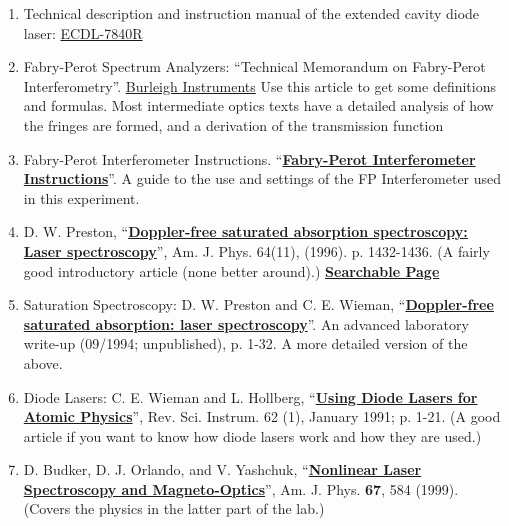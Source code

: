 \documentclass{../lab}
\begin{document}
\begin{enumerate}
    \item Technical description and instruction manual of the extended cavity diode laser: \href{http://physics111.lib.berkeley.edu/Physics111/Equipment_Manuals/manual_D1_ECDL_laser.pdf}{ECDL-7840R}

    \item Fabry-Perot Spectrum Analyzers: ``Technical Memorandum on Fabry-Perot Interferometry''. \href{http://experimentationlab.berkeley.edu/sites/default/files/tech-memo-fp-interferometry.pdf}{Burleigh Instruments} Use this article to get some definitions and formulas. Most intermediate optics texts have a detailed analysis of how the fringes are formed, and a derivation of the transmission function

    \item Fabry-Perot Interferometer Instructions. ``\href{http://physics111.lib.berkeley.edu/Physics111/Reprints/MNO/Fabry-Perot\_Instructions\_OCR.pdf}{\textbf{Fabry-Perot Interferometer Instructions}}''. A guide to the use and settings of the FP Interferometer used in this experiment.

    \item D. W. Preston, ``\href{http://ajp.aapt.org/resource/1/ajpias/v64/i11/p1432\_s1}{\textbf{Doppler-free saturated absorption spectroscopy: Laser spectroscopy}}'', Am. J. Phys. 64(11), (1996). p. 1432-1436. (A fairly good introductory article (none better around).) \href{http://physics111.lib.berkeley.edu/Physics111/Reprints/MNO/03-Doppler\_Free\_Saturated\_Absoprtion.pdf}{\textbf{Searchable Page}}

    \item Saturation Spectroscopy: D. W. Preston and C. E. Wieman, ``\href{http://physics111.lib.berkeley.edu/Physics111/Reprints/MNO/04-Doppler\_Free\_Saturated\_Absoprtion.pdf}{\textbf{Doppler-free saturated absorption: laser spectroscopy}}''. An advanced laboratory write-up (09/1994; unpublished), p. 1-32. A more detailed version of the above.

    \item Diode Lasers: C. E. Wieman and L. Hollberg, ``\href{http://physics111.lib.berkeley.edu/Physics111/Reprints/MNO/07-Using_Diode_Lasers.pdf}{\textbf{Using Diode Lasers for Atomic Physics}}'', Rev. Sci. Instrum. 62 (1), January 1991; p. 1-21. (A good article if you want to know how diode lasers work and how they are used.)

    \item D. Budker, D. J. Orlando, and V. Yashchuk, ``\href{http://physics111.lib.berkeley.edu/Physics111/Reprints/MNO/01-Nonlinear_Laser_Spectroscopy.pdf}{\textbf{Nonlinear Laser Spectroscopy and Magneto-Optics}}'', Am. J. Phys. \textbf{67}, 584 (1999). (Covers the physics in the latter part of the lab.)


\end{enumerate}
\end{document}
